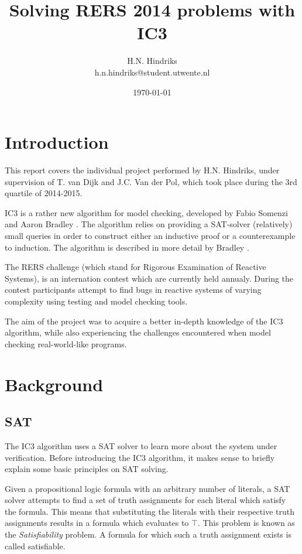 \documentclass[a4paper]{article}
\begin{document}
\title{Solving RERS 2014 problems with IC3}
\author{H.N. Hindriks\\h.n.hindriks@student.utwente.nl}
\date{\today}
\maketitle

\section{Introduction}
This report covers the individual project performed by H.N. Hindriks, under supervision of T. van Dijk and J.C. Van der Pol, which took place during the 3rd quartile of 2014-2015.

IC3 is a rather new algorithm for model checking, developed by Fabio Somenzi and Aaron Bradley \cite{Bradley2007}. The algorithm relies on providing a SAT-solver (relatively) small queries in order to construct either an inductive proof or a counterexample to induction. The algorithm is described in more detail by Bradley \cite{Bradley2011}.

The RERS challenge (which stand for Rigorous Examination of Reactive Systems), is an internation contest which are currently held annualy. During the contest participants attempt to find bugs in reactive systems of varying complexity using testing and model checking tools.

The aim of the project was to acquire a better in-depth knowledge of the IC3 algorithm, while also experiencing the challenges encountered when model checking real-world-like programs.

\section{Background}
\subsection{SAT}
The IC3 algorithm uses a SAT solver to learn more about the system under verification. Before introducing the IC3 algorithm, it makes sense to briefly explain some basic principles on SAT solving.

Given a propositional logic formula with an arbitrary number of literals, a SAT solver attempts to find a set of truth assignments for each literal which satisfy the formula. This means that substituting the literals with their respective truth assignments results in a formula which evaluates to $\top$. This problem is known as the \emph{Satisfiability} problem. A formula for which such a truth assignment exists is called satisfiable.
\end{document}
